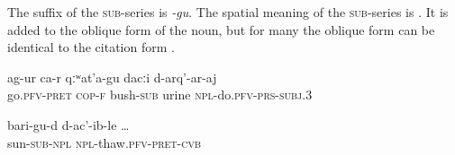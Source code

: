 The suffix of the \textsc{sub}-series is \textit{-gu}. The spatial meaning of the \textsc{sub}-series is . It is added to the oblique form of the noun, but for many  the oblique form can be identical to the citation form . 
%
\begin{exe}
	\ex	\label{(She) went to pee under the bushes}
	\gll	ag-ur ca-r	qːʷat'a-gu	dacːi	d-arq'-ar-aj \\
		go.\textsc{pfv}-\textsc{pret} \textsc{cop-f}	bush-\textsc{sub}	urine	\textsc{npl}-do.\textsc{pfv}-\textsc{prs}-\textsc{subj}.3\\
	\glt	{}

	
	\ex	\label{when (the worms) dissolved in the sun}
	\gll	bari-gu-d	d-ac'-ib-le	\ldots\\
		sun-\textsc{sub}-\textsc{npl}	\textsc{npl}-thaw.\textsc{pfv}-\textsc{pret}-\textsc{cvb}\\
	\glt	{}
\end{exe}	

